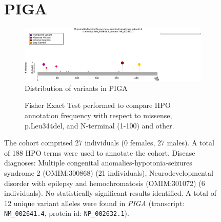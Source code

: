 \begin{figure}[htbp]
\section*{PIGA}
\centering
\begin{subfigure}[b]{0.95\textwidth}
\centering
\includegraphics[width=\textwidth]{ img/PIGA_protein_diagram.pdf} 
\captionsetup{justification=raggedright,singlelinecheck=false}
\caption{Distribution of variants in PIGA}
\end{subfigure}

\vspace{2em}

\begin{subfigure}[b]{0.95\textwidth}
\centering
{}
\captionsetup{justification=raggedright,singlelinecheck=false}
\caption{Fisher Exact Test performed to compare HPO annotation frequency with respect to missense, p.Leu344del, and N-terminal (1-100) and other. }
\end{subfigure}


\vspace{2em}

\caption{The cohort comprised 27 individuals (0 females, 27 males). A total of 188 HPO terms were used to annotate the cohort. Disease diagnoses: Multiple congenital anomalies-hypotonia-seizures syndrome 2 (OMIM:300868) (21 individuals), Neurodevelopmental disorder with epilepsy and hemochromatosis (OMIM:301072) (6 individuals). No statistically significant results identified. A total of 12 unique variant alleles were found in \textit{PIGA} (transcript: \texttt{NM\_002641.4}, protein id: \texttt{NP\_002632.1}).}
\end{figure}
